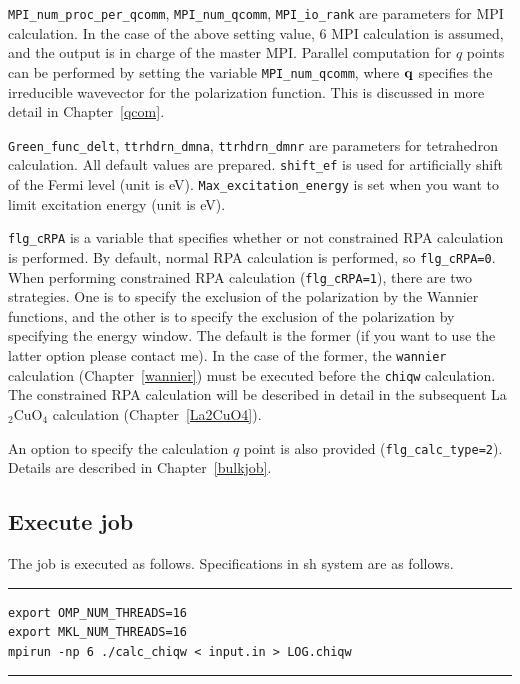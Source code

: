 \documentclass{article}
\begin{document}
\verb+MPI_num_proc_per_qcomm+, \verb+MPI_num_qcomm+, \verb+MPI_io_rank+ are parameters for MPI calculation. In the case of the above setting value, 6 MPI calculation is assumed, and the output is in charge of the master MPI. Parallel computation for $q$ points can be performed by setting the variable {\tt MPI\_num\_qcomm}, where ${\bf q}$ specifies the irreducible wavevector for the polarization function. This is discussed in more detail in Chapter~\ref{qcom}. 

\verb+Green_func_delt+, \verb+ttrhdrn_dmna+, \verb+ttrhdrn_dmnr+ are parameters for tetrahedron calculation. All default values are prepared. {\tt shift\_ef} is used for artificially shift of the Fermi level (unit is eV). \verb+Max_excitation_energy+ is set when you want to limit excitation energy (unit is eV).

\verb+flg_cRPA+ is a variable that specifies whether or not constrained RPA calculation is performed. By default, normal RPA calculation is performed, so \verb+flg_cRPA=0+. When performing constrained RPA calculation (\verb+flg_cRPA=1+), there are two strategies. One is to specify the exclusion of the polarization by the Wannier functions, and the other is to specify the exclusion of the polarization by specifying the energy window. The default is the former (if you want to use the latter option please contact me). In the case of the former, the {\tt wannier} calculation (Chapter~\ref{wannier}) must be executed before the {\tt chiqw} calculation. The constrained RPA calculation will be described in detail in the subsequent La$_2$CuO$_4$ calculation (Chapter~\ref{La2CuO4}).

An option to specify the calculation $q$ point is also provided (\verb+flg_calc_type=2+). Details are described in Chapter~\ref{bulkjob}.


\subsection{\label{job-chiqw}Execute job}
The job is executed as follows. Specifications in sh system are as follows.
\vspace{3mm}\hrule
\begin{verbatim}
export OMP_NUM_THREADS=16
export MKL_NUM_THREADS=16
mpirun -np 6 ./calc_chiqw < input.in > LOG.chiqw  
\end{verbatim}
\hrule\vspace{3mm}
\end{document}
